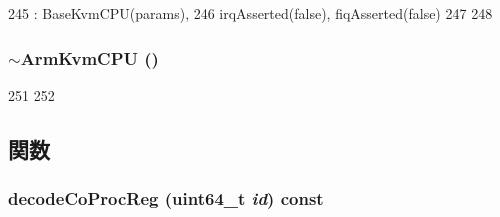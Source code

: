\begin{DoxyCode}
245     : BaseKvmCPU(params),
246       irqAsserted(false), fiqAsserted(false)
247 {
248 }
\end{DoxyCode}
\hypertarget{classArmKvmCPU_a5a7b2abd8e0f6124ff58343a788dfc1d}{
\subsubsection[{$\sim$ArmKvmCPU}]{\setlength{\rightskip}{0pt plus 5cm}$\sim${\bf ArmKvmCPU} ()}}
\label{classArmKvmCPU_a5a7b2abd8e0f6124ff58343a788dfc1d}



\begin{DoxyCode}
251 {
252 }
\end{DoxyCode}


\subsection{関数}
\hypertarget{classArmKvmCPU_a9b185ea78411f18604ed826462d010d7}{
\subsubsection[{decodeCoProcReg}]{ decodeCoProcReg (uint64\_\-t {\em id}) const}}
\label{classArmKvmCPU_a9b185ea78411f18604ed826462d010d7}




